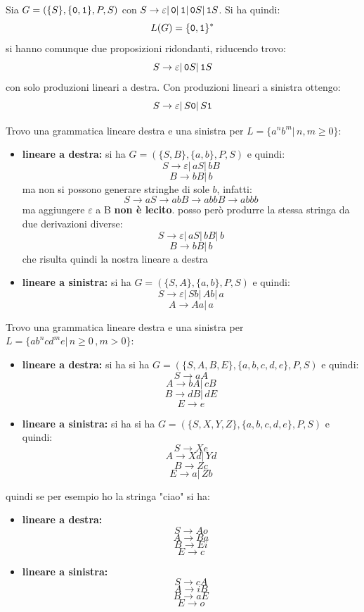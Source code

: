 \begin{example}
	Sia $G=(\{S\},\{\mathtt{0},\mathtt{1}\},P,S)$ con $S\to \varepsilon|\,\mathtt{0}|\,\mathtt{1}|\,\mathtt{0} S|\,\mathtt{1} S$. Si ha quindi:
	$$L(G)=\{\mathtt{0},\mathtt{1}\}^*$$
	si hanno comunque due proposizioni ridondanti, riducendo trovo:
	$$S\to \varepsilon|\,\mathtt{0} S|\,\mathtt{1} S$$
	con solo produzioni lineari a destra. Con produzioni lineari a sinistra ottengo:
	$$S\to \varepsilon|\, S\mathtt{0}|\,S\mathtt{1}$$
\end{example}
\begin{example}
	Trovo una grammatica lineare destra e una sinistra per $L=\{a^nb^m|\,n,m\geq 0\}$:
	\begin{itemize}
		\item \textbf{lineare a destra:} si ha $G=(\{S,B\},\{a,b\},P,S)$ e quindi:
		      $$S\to \varepsilon|\,aS|\,bB$$
		      $$B\to bB|\,b$$
		      ma non si possono generare stringhe di sole $b$, infatti:
		      $$S\to aS\to abB\to abbB\to abbb$$
		      ma aggiungere $\varepsilon$ a B \textbf{non è lecito}. posso però produrre la stessa stringa da due derivazioni diverse:
		      $$S\to \varepsilon|\,aS|\,bB|\,b$$
		      $$B\to bB|\,b$$
		      che risulta quindi la nostra lineare a destra
		\item \textbf{lineare a sinistra:} si ha $G=(\{S,A\},\{a,b\},P,S)$ e quindi:
		      $$S\to \varepsilon|\,Sb|\,Ab|\,a$$
		      $$A\to Aa|\,a$$
	\end{itemize}
\end{example}
\begin{example}
	Trovo una grammatica lineare destra e una sinistra per $L=\{ab^ncd^me|\,n\geq 0\,,m> 0\}$:
	\begin{itemize}
		\item \textbf{lineare a destra:} si ha  si ha $G=(\{S,A,B,E\},\{a,b,c,d,e\},P,S)$ e quindi:
		      $$S\to aA$$
		      $$A\to bA|\,cB$$
		      $$B\to dB|\, dE$$
		      $$E\to e$$
		\item \textbf{lineare a sinistra:} si ha  si ha $G=(\{S,X,Y,Z\},\{a,b,c,d,e\},P,S)$ e quindi:
		      $$S\to Xe$$
		      $$A\to Xd|\,Yd$$
		      $$B\to Zc$$
		      $$E\to a|\,Zb$$
	\end{itemize}
	quindi se per esempio ho la stringa "ciao" si ha:
	\begin{itemize}
		\item \textbf{lineare a destra:}
		      $$S\to Ao$$
		      $$A\to Ba$$
		      $$B\to Ei$$
		      $$E\to c$$
		\item \textbf{lineare a sinistra:}
		      $$S\to cA$$
		      $$A\to iB$$
		      $$B\to aE$$
		      $$E\to o$$
	\end{itemize}
\end{example}
